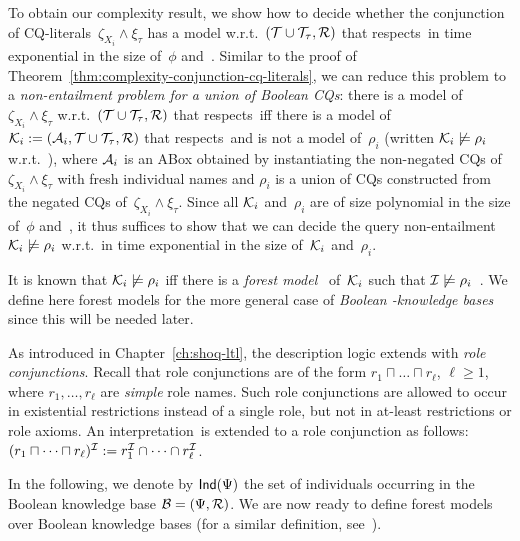 \noindent
To obtain our complexity result, we show how to decide whether the conjunction
of CQ-literals~$\zeta_{X_i}\land\xi_\tau$ has a model w.r.t.\
$(\mathcal{T}\cup\mathcal{T}_\tau,\mathcal{R})$ that respects~\Dmc in time exponential in the size
of~$\phi$ and~\Kmc.
%
Similar to the proof of Theorem~\ref{thm:complexity-conjunction-cq-literals}, we
can reduce this problem to a \emph{non-entailment problem for a union of Boolean
CQs}: there is a model of~$\zeta_{X_i}\land\xi_\tau$ w.r.t.\
$(\mathcal{T}\cup\mathcal{T}_\tau,\mathcal{R})$ that respects~\Dmc iff there is a model of
$\mathcal{K}_i:=(\mathcal{A}_i,\mathcal{T}\cup\mathcal{T}_\tau,\mathcal{R})$ that respects~\Dmc and is not a model
of~$\rho_i$ (written $\mathcal{K}_i\not\models\rho_i$ w.r.t.~\Dmc), where $\mathcal{A}_i$ is
an ABox obtained by instantiating the non-negated CQs
of~$\zeta_{X_i}\land\xi_\tau$ with fresh individual names and $\rho_i$ is a
union of CQs constructed from the negated CQs of~$\zeta_{X_i}\land\xi_\tau$.
%
Since all $\mathcal{K}_i$ and~$\rho_i$ are of size polynomial in the size of~$\phi$
and~\Kmc, it thus suffices to show that we can decide the query non-entailment
$\mathcal{K}_i\not\models\rho_i$ w.r.t.~\Dmc in time exponential in the size
of~$\mathcal{K}_i$ and~$\rho_i$.

It is known that $\mathcal{K}_i\not\models\rho_i$ iff there is a \emph{forest model}~\Imc
of~$\mathcal{K}_i$ such that $\mathcal{I}\not\models\rho_i$~\cite{GHL+-JAIR08,Lut-IJCAR08}.
%
We define here forest models for the more general case of \emph{Boolean
\SHQcap-knowledge bases} since this will be needed later.

As introduced in Chapter~\ref{ch:shoq-ltl}, the description logic \SHQcap extends
\SHQ with \emph{role conjunctions}.  Recall that role conjunctions are of the
form $r_1\sqcap\dots\sqcap r_\ell$, $\ell\ge 1$, where $r_1,\dots,r_\ell$ are
\emph{simple} role names.
%
Such role conjunctions are allowed to occur in existential restrictions instead
of a single role, but not in at-least restrictions or role axioms.
%
An interpretation~\Imc is extended to a role conjunction as follows:
$(r_1\sqcap\dots\sqcap r_\ell)^\mathcal{I}:=r_1^\mathcal{I}\cap\dots\cap r_\ell^\mathcal{I}$.

In the following, we denote by $\mathsf{Ind}(\Psi)$ the set of individuals occurring in
the Boolean knowledge base $\mathcal{B}=(\Psi,\mathcal{R})$.
%
We are now ready to define forest models over Boolean knowledge bases
(for a similar definition, see~\cite{GHL+-JAIR08}).


